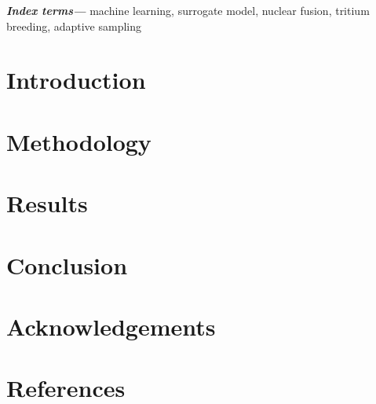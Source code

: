 \documentclass[12pt]{iopart}
\providecommand{\keywords}[1]{\textbf{\textit{Index terms---}} #1}
\begin{document}
\keywords{machine learning, surrogate model, nuclear fusion, tritium breeding, adaptive sampling}
\submitto{\NF}
\maketitle
\ioptwocol


\section{Introduction}
\label{sec:introduction}


\section{Methodology}
\label{sec:methodoglogy}


\section{Results}
\label{sec:results}


\section{Conclusion}
\label{sec:conclusion}




\section{Acknowledgements}
\label{sec:acknowledgements}


\section{References}
\label{sec:references}


\end{document}
